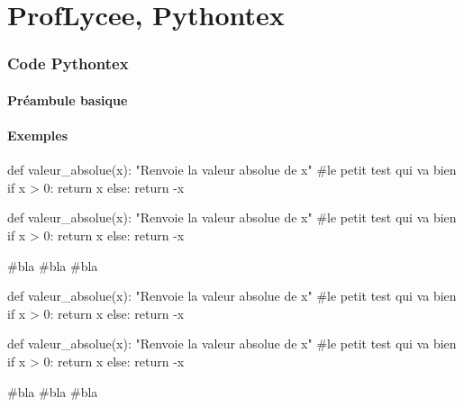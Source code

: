 \documentclass[french,a4paper,10pt]{article}
\begin{document}
\part*{ProfLycee, Pythontex}

\section{Code \og Pythontex \fg{}}

\subsection{Préambule basique}

{\small {}}

\subsection{Exemples}

{\small \begin{codehigh}
\begin{CodePythontex}{}
def valeur_absolue(x):
    "Renvoie la valeur absolue de x"
    #le petit test qui va bien
    if x > 0:
        return x
    else:
    return -x
\end{CodePythontex}
\end{codehigh}}

\begin{CodePythontex}{}
def valeur_absolue(x):
	"Renvoie la valeur absolue de x"
	#le petit test qui va bien
	if x > 0:
		return x
	else:
		return -x

#bla
#bla
#bla
\end{CodePythontex}

{\small \begin{codehigh}
\begin{CodePythontexAlt}[Largeur=10cm,Centre,PremLigne=10]{}
def valeur_absolue(x):
    "Renvoie la valeur absolue de x"
    #le petit test qui va bien
    if x > 0:
        return x
    else:
    return -x
\end{CodePythontexAlt}
\end{codehigh}}

\begin{CodePythontexAlt}[Largeur=10cm,Centre,PremLigne=10]{}
def valeur_absolue(x):
	"Renvoie la valeur absolue de x"
	#le petit test qui va bien
	if x > 0:
		return x
	else:
		return -x

#bla
#bla
#bla
\end{CodePythontexAlt}
\end{document}
